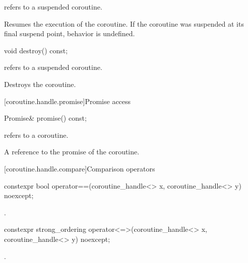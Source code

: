 \begin{itemdescr}
\pnum
\requires {} refers to a suspended coroutine.

\pnum
\effects Resumes the execution of the coroutine. If the coroutine
was suspended at its final suspend point, behavior is undefined.
\end{itemdescr}

%
\begin{itemdecl}
void destroy() const;
\end{itemdecl}

\begin{itemdescr}
\pnum
\requires {} refers to a suspended coroutine.

\pnum
\effects Destroys the coroutine.
\end{itemdescr}

[coroutine.handle.promise]{Promise access}

%
\begin{itemdecl}
Promise& promise() const;
\end{itemdecl}

\begin{itemdescr}
\pnum
\requires {} refers to a coroutine.

\pnum
\returns A reference to the promise of the coroutine.
\end{itemdescr}

[coroutine.handle.compare]{Comparison operators}

%
%
\begin{itemdecl}
constexpr bool operator==(coroutine_handle<> x, coroutine_handle<> y) noexcept;
\end{itemdecl}

\begin{itemdescr}
\pnum \returns {}.
\end{itemdescr}

%
\begin{itemdecl}
constexpr strong_ordering operator<=>(coroutine_handle<> x, coroutine_handle<> y) noexcept;
\end{itemdecl}

\begin{itemdescr}
\pnum \returns {}.
\end{itemdescr}

